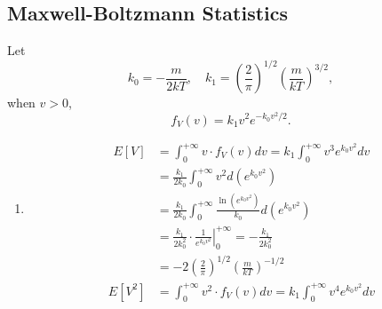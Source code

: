 \documentclass[11pt,a4paper]{article}
\begin{document}
\subsection{Maxwell-Boltzmann Statistics}
Let $$k_0=-\frac{m}{2kT},\quad k_1=\left(\frac{2}{\pi}\right)^{1/2}\left(\frac{m}{kT}\right)^{3/2},$$
when $v>0$,
$$f_V(v)=k_1v^2e^{-k_0v^2/2}.$$
\begin{enumerate}[label=\roman*)]
\item
\begin{align*}
E[V]&=\int_0^{+\infty}v\cdot f_V(v)dv=k_1\int_0^{+\infty}v^3e^{k_0v^2}dv\\
&=\frac{k_1}{2k_0}\int_0^{+\infty}v^2d(e^{k_0v^2})\\
&=\frac{k_1}{2k_0}\int_0^{+\infty}\frac{\ln(e^{k_0v^2})}{k_0}d(e^{k_0v^2})\\
&=\frac{k_1}{2k_0^2}\cdot\left.\frac{1}{e^{k_0v^2}}\right|_0^{+\infty}=-\frac{k_1}{2k_0^2}\\
&=-2\left(\frac{2}{\pi}\right)^{1/2}\left(\frac{m}{kT}\right)^{-1/2}
\end{align*}
\begin{align*}
E[V^2]&=\int_0^{+\infty}v^2\cdot f_V(v)dv=k_1\int_0^{+\infty}v^4e^{k_0v^2}dv\\
\end{align*}
\end{enumerate}
\end{document}
